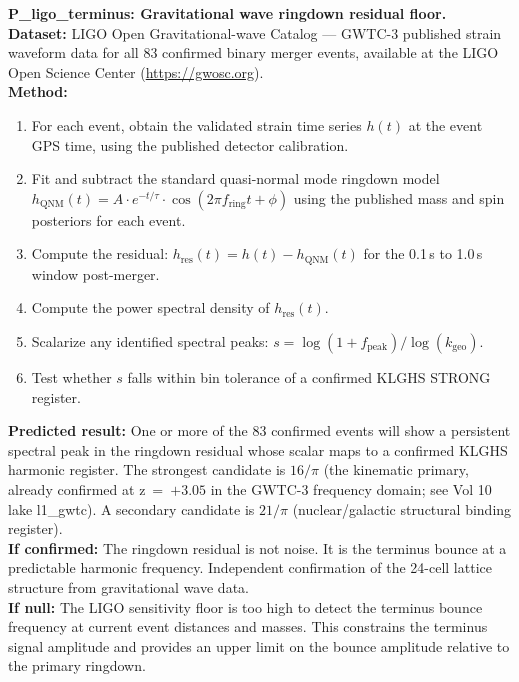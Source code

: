 \documentclass[11pt, letterpaper, openany]{book}
\begin{document}
\begin{predictionbox}
\textbf{P\_ligo\_terminus: Gravitational wave ringdown residual floor.}\\[0.5em]
\textbf{Dataset:} LIGO Open Gravitational-wave Catalog --- GWTC-3 published
strain waveform data for all 83 confirmed binary merger events, available
at the LIGO Open Science Center (\url{https://gwosc.org}).\\[0.5em]
\textbf{Method:}
\begin{enumerate}
    \item For each event, obtain the validated strain time series $h(t)$
    at the event GPS time, using the published detector calibration.
    \item Fit and subtract the standard quasi-normal mode ringdown model
    $h_\text{QNM}(t) = A \cdot e^{-t/\tau} \cdot \cos(2\pi f_\text{ring} t + \phi)$
    using the published mass and spin posteriors for each event.
    \item Compute the residual: $h_\text{res}(t) = h(t) - h_\text{QNM}(t)$
    for the 0.1\,s to 1.0\,s window post-merger.
    \item Compute the power spectral density of $h_\text{res}(t)$.
    \item Scalarize any identified spectral peaks:
    $s = \log(1 + f_\text{peak}) / \log(k_\text{geo})$.
    \item Test whether $s$ falls within bin tolerance of a confirmed KLGHS
    STRONG register.
\end{enumerate}
\textbf{Predicted result:} One or more of the 83 confirmed events will show
a persistent spectral peak in the ringdown residual whose scalar maps to
a confirmed KLGHS harmonic register. The strongest candidate is $16/\pi$
(the kinematic primary, already confirmed at z~=~$+3.05$ in the GWTC-3
frequency domain; see Vol 10 lake l1\_gwtc). A secondary candidate
is $21/\pi$ (nuclear/galactic structural binding register).\\[0.5em]
\textbf{If confirmed:} The ringdown residual is not noise. It is the
terminus bounce at a predictable harmonic frequency. Independent confirmation
of the 24-cell lattice structure from gravitational wave data.\\[0.5em]
\textbf{If null:} The LIGO sensitivity floor is too high to detect the
terminus bounce frequency at current event distances and masses. This
constrains the terminus signal amplitude and provides an upper limit
on the bounce amplitude relative to the primary ringdown.
\end{predictionbox}
\end{document}
